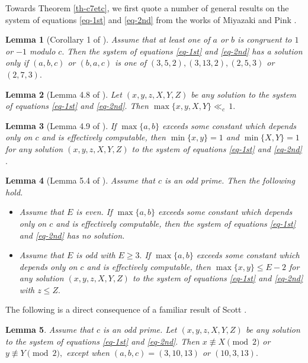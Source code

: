 \documentclass[11pt]{amsart}
\newtheorem{lem}{Lemma}[section]
\numberwithin{equation}{section}
\begin{document}
Towards Theorem \ref{th-c7etc}, we first quote a number of general results on the system of equations \eqref{eq-1st} and \eqref{eq-2nd} from the works of Miyazaki and Pink \cite{MP2,MP3}.

\begin{lem}[Corollary 1 of \cite{MP2}] \label{lem-E1}
Assume that at least one of $a$ or $b$ is congruent to $1$ or $-1$ modulo $c.$
Then the system of equations \eqref{eq-1st} and \eqref{eq-2nd} has a solution only if $(a,b,c)$ or $(b,a,c)$ is one of $(3,5,2),(3,13,2),(2,5,3)$ or $(2,7,3).$
\end{lem}

\begin{lem}[Lemma 4.8 of \cite{MP3}] \label{lem-xyXY-finite}
Let $(x,y,z,X,Y,Z)$ be any solution to the system of equations \eqref{eq-1st} and \eqref{eq-2nd}$.$
Then $\max\{x,y,X,Y\} \ll_{c}\,1.$
\end{lem}

\begin{lem}[Lemma 4.9 of \cite{MP3}] \label{lem-minxy1-minXY1}
If $\max\{a,b\}$ exceeds some constant which depends only on $c$ and is effectively computable, then $\min\{x,y\}=1$ and $\min\{X,Y\}=1$ for any solution $(x,y,z,X,Y,Z)$ to the system of equations \eqref{eq-1st} and \eqref{eq-2nd}$.$
\end{lem}

\begin{lem}[Lemma 5.4 of \cite{MP3}]\label{lem-Evalue}
Assume that $c$ is an odd prime.
Then the following hold. 
\begin{itemize}
\item[$\bullet$]
Assume that $E$ is even.
If $\max\{a,b\}$ exceeds some constant which depends only on $c$ and is effectively computable, then the system of equations \eqref{eq-1st} and \eqref{eq-2nd} has no solution.
\item[$\bullet$]
Assume that $E$ is odd with $E \ge 3.$
If $\max\{a,b\}$ exceeds some constant which depends only on $c$ and is effectively computable, then $\max\{x,y\} \le E-2$ for any solution $(x,y,z,X,Y,Z)$ to the system of equations \eqref{eq-1st} and \eqref{eq-2nd} with $z \le Z.$
\end{itemize}
\end{lem}

The following is a direct consequence of a familiar result of Scott \cite[Lemma 6]{Sc}.

\begin{lem}\label{lem-paritylemma}
Assume that $c$ is an odd prime.
Let $(x,y,z,X,Y,Z)$ be any solution to the system of equations \eqref{eq-1st} and \eqref{eq-2nd}$.$
Then $x \not\equiv X \pmod{2}$ or $y \not\equiv Y \pmod{2},$ except when $(a,b,c)=(3,10,13)$ or $(10,3,13).$
\end{lem}
\end{document}
